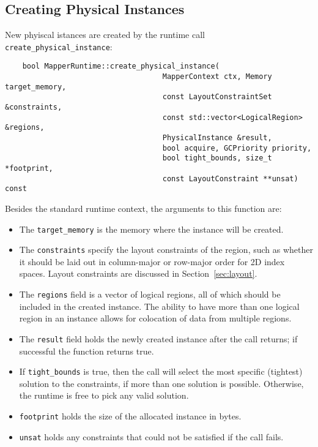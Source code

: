 \subsection{Creating Physical Instances}
\label{subsec:mapping:instances}

New phyiscal istances are created by the runtime call {\tt create\_physical\_instance}:
\begin{lstlisting}
    bool MapperRuntime::create_physical_instance(
                                    MapperContext ctx, Memory target_memory,
                                    const LayoutConstraintSet &constraints, 
                                    const std::vector<LogicalRegion> &regions,
                                    PhysicalInstance &result, 
                                    bool acquire, GCPriority priority,
                                    bool tight_bounds, size_t *footprint,
                                    const LayoutConstraint **unsat) const
\end{lstlisting}
Besides the standard runtime context, the arguments to this function are:
\begin{itemize}
\item The {\tt target\_memory} is the memory where the instance will be created.
  \item  The {\tt constraints} specify the layout constraints of the region, such as whether it should be laid out in column-major or row-major order for 2D index spaces.  Layout constraints are discussed in Section~\ref{sec:layout}.
\item The {\tt regions} field is a vector of logical regions, all of which should be included in the created instance.  The ability to have more than one logical region in an instance allows for colocation of data from multiple regions.
\item The {\tt result} field holds the newly created instance after the call returns; if successful the function returns true.
\item If {\tt tight\_bounds} is true, then the call will select the most specific (tightest) solution to the constraints, if more than one solution is possible.  Otherwise, the runtime is free to pick any valid solution.
\item {\tt footprint} holds the size of the allocated instance in bytes.
\item {\tt unsat} holds any constraints that could not be satisfied if the call fails.
\end{itemize}

